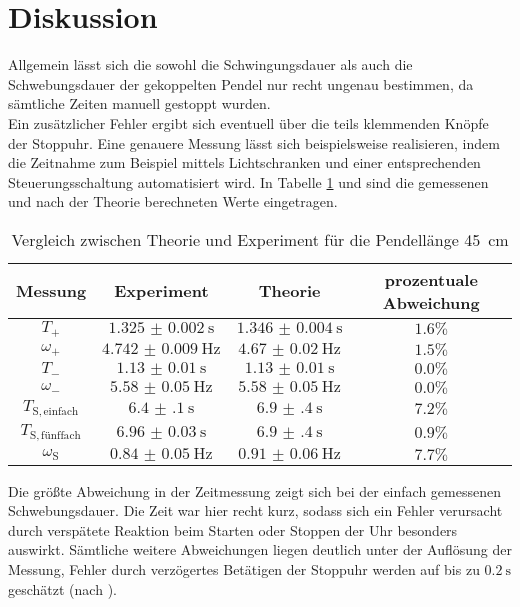 \section{Diskussion}
\label{sec:Diskussion}
Allgemein lässt sich die sowohl die Schwingungsdauer als auch die Schwebungsdauer der gekoppelten Pendel nur recht ungenau bestimmen, da sämtliche Zeiten manuell gestoppt wurden.\\
Ein zusätzlicher Fehler ergibt sich eventuell über die teils klemmenden Knöpfe der Stoppuhr.
Eine genauere Messung lässt sich beispielsweise realisieren, indem die Zeitnahme zum Beispiel mittels Lichtschranken und einer entsprechenden Steuerungsschaltung automatisiert wird.
In Tabelle \ref{tab:discuss} und %
sind die gemessenen und nach der Theorie berechneten Werte eingetragen.

\begin{table}
	\caption{Vergleich zwischen Theorie und Experiment für die Pendellänge 45 \,\si{\centi\meter}}
	\label{tab:discuss}
	\begin{tabular}{cccc}
		\toprule
		Messung                    & Experiment               & Theorie                  & prozentuale Abweichung \\
		\midrule
		$T_{\mathrm{+}}$           & $\SI{1.325(2)}{\second}$ & $\SI{1.346(4)}{\second}$ & $1.6\%$                \\
		$\omega_{\mathrm{+}}$      & $\SI{4.742(9)}{\Hz}$     & $\SI{4.67(2)}{\Hz}$      & $1.5\%$                \\
		$T_{\mathrm{-}}$           & $\SI{1.13(1)}{\second}$  & $\SI{1.13(1)}{\second}$  & $0.0\% $               \\
		$\omega_{\mathrm{-}}$      & $\SI{5.58(5)}{\Hz}$      & $\SI{5.58(5)}{\Hz}$      & $0.0\%$                \\
		$T_{\mathrm{S,einfach}}$   & $\SI{6.4(1)}{\second}$   & $\SI{6.9(4)}{\second}$   & $7.2\%$                \\
		$T_{\mathrm{S,fünffach}}$ & $\SI{6.96(3)}{\second}$  & $\SI{6.9(4)}{\second}$   & $0.9\%$                \\
		$\omega_{\mathrm{S}}$      & $\SI{0.84(5)}{\Hz}$      & $\SI{0.91(6)}{\Hz}$      & $7.7\%$                \\
		\bottomrule
	\end{tabular}
\end{table}
Die größte Abweichung in der Zeitmessung zeigt sich bei der einfach gemessenen Schwebungsdauer. Die Zeit war hier recht kurz, sodass sich ein Fehler verursacht durch verspätete Reaktion beim Starten oder Stoppen der Uhr besonders auswirkt.
Sämtliche weitere Abweichungen liegen deutlich unter der Auflösung der Messung, Fehler durch verzögertes Betätigen der Stoppuhr werden auf bis zu $\SI{0.2}{\second}$ geschätzt (nach \cite{CS-Pro}).
